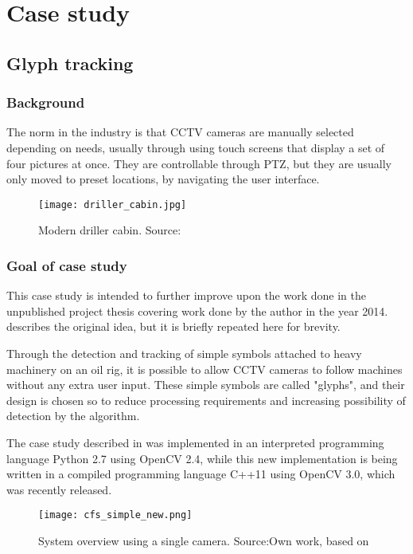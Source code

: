 \chapter{Case study}
\section{Glyph tracking}
\subsection{Background}

The norm in the industry is that CCTV cameras are manually selected depending on needs, usually through using touch screens that display a set of four pictures at once. They are controllable through PTZ, but they are usually only moved to preset locations, by navigating the user interface.

\begin{figure}[ht]
    \centering
    \texttt{[image: driller\_cabin.jpg]}
    \caption{Modern driller cabin. Source:\cite{}}
    \label{fig:}
\end{figure}
\FloatBarrier

\subsection{Goal of case study}
This case study is intended to further improve upon the work done in the unpublished project thesis covering work done by the author in the year 2014. \citet{joakimsk14} describes the original idea, but it is briefly repeated here for brevity.

Through the detection and tracking of simple symbols attached to heavy machinery on an oil rig, it is possible to allow CCTV cameras to follow machines without any extra user input. These simple symbols are called "glyphs", and their design is chosen so to reduce processing requirements and increasing possibility of detection by the algorithm.

The case study described in \citet{joakimsk14} was implemented in an interpreted programming language Python 2.7 using OpenCV 2.4, while this new implementation is being written in a compiled programming language C++11 using OpenCV 3.0, which was recently released.

\begin{figure}[ht]
    \centering
    \texttt{[image: cfs\_simple\_new.png]}
    \caption{System overview using a single camera. Source:Own work, based on \citet{joakimsk14}}
    \label{fig:cfs_simple_new}
\end{figure}
\FloatBarrier

